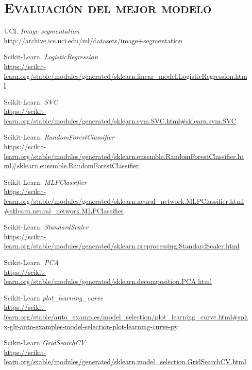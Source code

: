 \documentclass[11pt,a4paper]{article}
\begin{document}
\section{\textsc{Evaluación del mejor modelo}}



\newpage

\begin{thebibliography}{20}

UCI. \textit{Image segmentation}
\\\url{http://archive.ics.uci.edu/ml/datasets/image+segmentation}

Scikit-Learn. \textit{LogisticRegression}
\\\url{https://scikit-learn.org/stable/modules/generated/sklearn.linear_model.LogisticRegression.html}

Scikit-Learn. \textit{SVC}
\\\url{https://scikit-learn.org/stable/modules/generated/sklearn.svm.SVC.html#sklearn.svm.SVC}

Scikit-Learn. \textit{RandomForestClassifier}
\\\url{https://scikit-learn.org/stable/modules/generated/sklearn.ensemble.RandomForestClassifier.html#sklearn.ensemble.RandomForestClassifier}

Scikit-Learn. \textit{MLPClassifier}
\\\url{https://scikit-learn.org/stable/modules/generated/sklearn.neural_network.MLPClassifier.html#sklearn.neural_network.MLPClassifier}

Scikit-Learn. \textit{StandardScaler}
\\\url{https://scikit-learn.org/stable/modules/generated/sklearn.preprocessing.StandardScaler.html}

Scikit-Learn. \textit{PCA}
\\\url{https://scikit-learn.org/stable/modules/generated/sklearn.decomposition.PCA.html}

Scikit-Learn \textit{plot\_learning\_curve}
\\\url{https://scikit-learn.org/stable/auto_examples/model_selection/plot_learning_curve.html#sphx-glr-auto-examples-model-selection-plot-learning-curve-py}

Scikit-Learn \textit{GridSearchCV}
\\\url{https://scikit-learn.org/stable/modules/generated/sklearn.model_selection.GridSearchCV.html}

\end{thebibliography}
\end{document}
